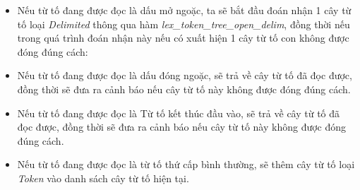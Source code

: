 \begin{itemize}
  \item Nếu từ tố đang được đọc là dấu mở ngoặc, ta sẽ bắt đầu đoán nhận 1 cây từ tố loại \textit{Delimited} thông qua hàm \textit{lex\_token\_tree\_open\_delim}, đồng thời nếu trong quá trình đoán nhận này nếu có xuất hiện 1 cây từ tố con không được đóng đúng cách:
  \item Nếu từ tố đang được đọc là dấu đóng ngoặc, sẽ trả về cây từ tố đã đọc được, đồng thời sẽ đưa ra cảnh báo nếu cây từ tố này không được đóng đúng cách.
  \item Nếu từ tố đang được đọc là Từ tố kết thúc đầu vào, sẽ trả về cây từ tố đã đọc được, đồng thời sẽ đưa ra cảnh báo nếu cây từ tố này không được đóng đúng cách.
  \item Nếu từ tố đang được đọc là từ tố thứ cấp bình thường, sẽ thêm cây từ tố loại \textit{Token} vào danh sách cây từ tố hiện tại.
\end{itemize}